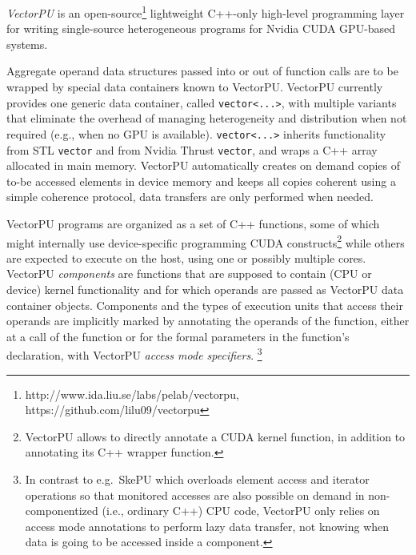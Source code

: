 \textit{VectorPU} \cite{VectorPU-2017} is an open-source\footnote{http://www.ida.liu.se/labs/pelab/vectorpu, https://github.com/lilu09/vectorpu} lightweight C++-only 
high-level programming layer
for writing single-source heterogeneous programs for Nvidia CUDA GPU-based systems.

Aggregate operand data structures 
passed into or out of  function calls are
to be wrapped by special data containers known to VectorPU.
VectorPU currently provides one generic data container,
called \verb+vector<...>+,
with multiple variants that 
eliminate the overhead of managing heterogeneity and distribution when not required (e.g., when no GPU is available). 
\verb+vector<...>+ inherits functionality from STL \verb.vector. 
and from Nvidia Thrust \verb.vector., and
wraps a C++ array allocated in main memory. 
VectorPU automatically creates on demand
copies of to-be accessed elements in device memory and keeps all copies coherent using
a simple coherence protocol, data transfers are only performed when needed. 

VectorPU programs are organized as a set of C++ functions, some of which
might internally use device-specific programming CUDA constructs\footnote{%
VectorPU allows to directly annotate a CUDA kernel function, in addition to annotating its C++ wrapper function.} while others
are expected to execute on the host, using one or possibly multiple cores.
VectorPU \emph{components} are functions that are supposed to contain (CPU or device)
kernel functionality and for which  operands are passed as VectorPU data container objects. 
Components and the types of execution units that
access their operands are implicitly marked 
by annotating the operands of the function, either at a call of the function
or for the formal parameters in the function's declaration, 
with VectorPU \emph{access mode specifiers}.%
\footnote{In contrast to e.g.\ SkePU \cite{Enmyren10} which overloads element
access and iterator operations so that monitored 
accesses are also possible on demand in non-componentized (i.e., 
ordinary C++) CPU code,
VectorPU only relies on access mode annotations 
to perform lazy data transfer,
not knowing when data is going to be accessed inside a component.}

